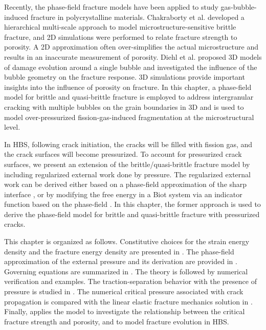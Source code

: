 Recently, the phase-field fracture models have been applied to study gas-bubble-induced fracture in polycrystalline materials. Chakraborty et al. \cite{pritam_2016} developed a hierarchical multi-scale approach to model microstructure-sensitive brittle fracture, and 2D simulations were performed to relate fracture strength to porosity. A 2D approximation often over-simplifies the actual microstructure and results in an inaccurate measurement of porosity. Diehl et al. \cite{Diehl2017} proposed 3D models of damage evolution around a single bubble and investigated the influence of the bubble geometry on the fracture response. 3D simulations provide important insights into the influence of porosity on fracture. In this chapter, a phase-field model for brittle and quasi-brittle fracture is employed to address intergranular cracking with multiple bubbles on the grain boundaries in 3D and is used to model over-pressurized fission-gas-induced fragmentation at the microstructural level.

In HBS, following crack initiation, the cracks will be filled with fission gas, and the crack surfaces will become pressurized. To account for pressurized crack surfaces, we present an extension of the brittle/quasi-brittle fracture model by including regularized external work done by pressure. The regularized external work can be derived either based on a phase-field approximation of the sharp interface \cite{CHUKWUDOZIE2019957}, or by modifying the free energy in a Biot system via an indicator function based on the phase-field \cite{Mikeli__2015}. In this chapter, the former approach is used to derive the phase-field model for brittle and quasi-brittle fracture with pressurized cracks.

This chapter is organized as follows. Constitutive choices for the strain energy density and the fracture energy density are presented in .
The phase-field approximation of the external pressure and its derivation are provided in .
Governing equations are summarized in .
The theory is followed by numerical verification and examples.
The traction-separation behavior with the presence of pressure is studied in .
The numerical critical pressure associated with crack propagation is compared with the linear elastic fracture mechanics solution in .
Finally,  applies the model to investigate the relationship between the critical fracture strength and porosity, and to model fracture evolution in HBS.
